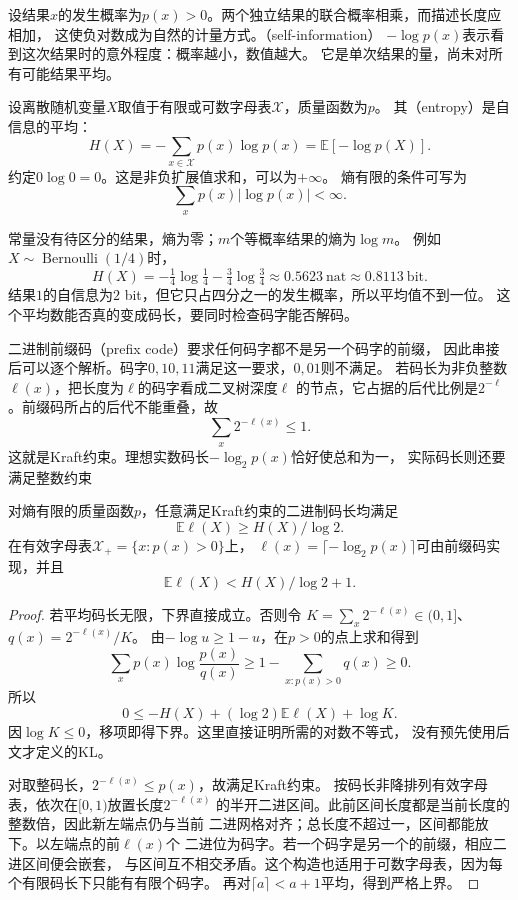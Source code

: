 设结果\(x\)的发生概率为\(p(x)>0\)。两个独立结果的联合概率相乘，而描述长度应相加，
这使负对数成为自然的计量方式。（self-information）
\(-\log p(x)\)表示看到这次结果时的意外程度：概率越小，数值越大。
它是单次结果的量，尚未对所有可能结果平均。

\begin{definition}[离散熵]
\label{def:information-discrete-entropy}
设离散随机变量\(X\)取值于有限或可数字母表\(\mathcal X\)，质量函数为\(p\)。
其（entropy）是自信息的平均：
\begin{equation}
  H(X)=-\sum_{x\in\mathcal X}p(x)\log p(x)
      =\mathbb E[-\log p(X)].
  \label{eq:information-discrete-entropy}
\end{equation}
约定\(0\log0=0\)。这是非负扩展值求和，可以为\(+\infty\)。
熵有限的条件可写为
\[
  \sum_xp(x)|\log p(x)|<\infty.
\]
\end{definition}

常量没有待区分的结果，熵为零；\(m\)个等概率结果的熵为\(\log m\)。
例如\(X\sim\operatorname{Bernoulli}(1/4)\)时，
\[
  H(X)=-\tfrac14\log\tfrac14-\tfrac34\log\tfrac34
       \approx0.5623\ \mathrm{nat}\approx0.8113\ \mathrm{bit}.
\]
结果\(1\)的自信息为\(2\) bit，但它只占四分之一的发生概率，所以平均值不到一位。
这个平均数能否真的变成码长，要同时检查码字能否解码。

二进制前缀码（prefix code）要求任何码字都不是另一个码字的前缀，
因此串接后可以逐个解析。码字\(0,10,11\)满足这一要求，\(0,01\)则不满足。
若码长为非负整数\(\ell(x)\)，把长度为\(\ell\)的码字看成二叉树深度\(\ell\)
的节点，它占据的后代比例是\(2^{-\ell}\)。前缀码所占的后代不能重叠，故
\[
  \sum_x2^{-\ell(x)}\leq1.
\]
这就是Kraft约束。理想实数码长\(-\log_2p(x)\)恰好使总和为一，
实际码长则还要满足整数约束

\begin{theorem}[无失真前缀码的平均长度界]
\label{thm:information-source-coding-bound}
对熵有限的质量函数\(p\)，任意满足Kraft约束的二进制码长均满足
\[
  \mathbb E\ell(X)\geq H(X)/\log2.
\]
在有效字母表\(\mathcal X_+=\{x:p(x)>0\}\)上，
\(\ell(x)=\lceil-\log_2p(x)\rceil\)可由前缀码实现，并且
\[
  \mathbb E\ell(X)<H(X)/\log2+1.
\]
\end{theorem}
\begin{proof}
若平均码长无限，下界直接成立。否则令
\(K=\sum_x2^{-\ell(x)}\in(0,1]\)、\(q(x)=2^{-\ell(x)}/K\)。
由\(-\log u\geq1-u\)，在\(p>0\)的点上求和得到
\[
  \sum_xp(x)\log\frac{p(x)}{q(x)}
  \geq1-\sum_{x:p(x)>0}q(x)\geq0.
\]
所以
\[
  0\leq-H(X)+(\log2)\mathbb E\ell(X)+\log K.
\]
因\(\log K\leq0\)，移项即得下界。这里直接证明所需的对数不等式，
没有预先使用后文才定义的KL。

对取整码长，\(2^{-\ell(x)}\leq p(x)\)，故满足Kraft约束。
按码长非降排列有效字母表，依次在\([0,1)\)放置长度\(2^{-\ell(x)}\)
的半开二进区间。此前区间长度都是当前长度的整数倍，因此新左端点仍与当前
二进网格对齐；总长度不超过一，区间都能放下。以左端点的前\(\ell(x)\)个
二进位为码字。若一个码字是另一个的前缀，相应二进区间便会嵌套，
与区间互不相交矛盾。这个构造也适用于可数字母表，因为每个有限码长下只能有有限个码字。
再对\(\lceil a\rceil<a+1\)平均，得到严格上界。
\end{proof}

